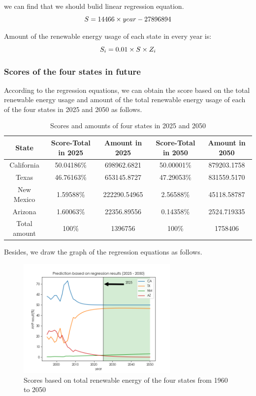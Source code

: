 \documentclass[a4paper,11pt]{article}
\begin{document}
we can find that we should bulid linear regression equation.
\begin{equation}
    \centering
S=14466 \times year-27896894
\end{equation}
\par Amount of the renewable energy usage of each state in every year is:
\begin{equation}
    \centering
    S_i=0.01 \times S \times Z_i
\end{equation}

\subsubsection{Scores of the four states in future}
\par According to the regression equations, we can obtain the score based on the total renewable energy usage and amount of the total renewable energy usage of each of the four states in 2025 and 2050 as follows.
\begin{table}[!hbp]
    \centering 
    \begin{tabular}{|c|c|c|c|c|}
\hline
State & Score-Total in 2025 & Amount in 2025 & Score-Total in 2050 & Amount in 2050\\
\hline
California & 50.04186\% & 698962.6821 & 50.00001\% & 879203.1758 \\
\hline
Texas & 46.76163\% & 653145.8727 & 47.29053\% & 831559.5170 \\
\hline
New Mexico & 1.59588\% & 222290.54965 & 2.56588\% & 45118.58787 \\
\hline
Arizona & 1.60063\% & 22356.89556 & 0.14358\% &2524.719335 \\
\hline
Total amount & 100\% & 1396756 & 100\% & 1758406 \\
\hline
\end{tabular}
\caption{Scores and amounts of four states in 2025 and 2050}
\label{tab:Scores and amounts}
\end{table}
\par Besides, we draw the graph of the regression equations as follows.
\begin{figure}[h]%
    \centering 
    \includegraphics[width=0.7\textwidth]{./Pic/D-scores.png}
    \caption{Scores based on total renewable energy of the four states from 1960 to 2050}
    \label{fig:D-scores}  
\end{figure}
\end{document}
